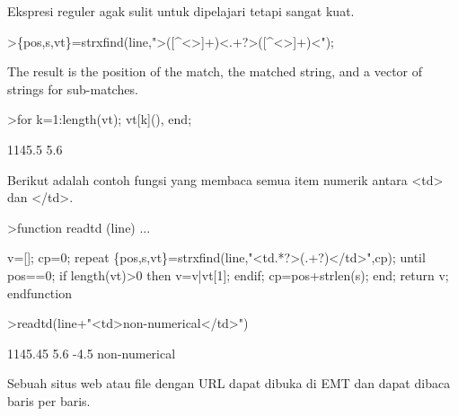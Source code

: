 \documentclass[a4paper,10pt]{article}
\begin{document}
\begin{eulernotebook}
\begin{eulercomment}
\begin{eulercomment}
\begin{eulercomment}
\begin{eulercomment}
\begin{eulercomment}
\begin{eulercomment}
\begin{eulercomment}
Ekspresi reguler agak sulit untuk dipelajari tetapi sangat kuat.
\end{eulercomment}
\begin{eulerprompt}
>\{pos,s,vt\}=strxfind(line,">([^<>]+)<.+?>([^<>]+)<");
\end{eulerprompt}
\begin{eulercomment}
The result is the position of the match, the matched string, and a
vector of strings for sub-matches.
\end{eulercomment}
\begin{eulerprompt}
>for k=1:length(vt); vt[k](), end;
\end{eulerprompt}
\begin{euleroutput}
  1145.5
  5.6
\end{euleroutput}
\begin{eulercomment}
Berikut adalah contoh fungsi yang membaca semua item numerik antara
\textless{}td\textgreater{} dan \textless{}/td\textgreater{}.
\end{eulercomment}
\begin{eulerprompt}
>function readtd (line) ...
\end{eulerprompt}
\begin{eulerudf}
  v=[]; cp=0;
  repeat
     \{pos,s,vt\}=strxfind(line,"<td.*?>(.+?)</td>",cp);
     until pos==0;
     if length(vt)>0 then v=v|vt[1]; endif;
     cp=pos+strlen(s);
  end;
  return v;
  endfunction
\end{eulerudf}
\begin{eulerprompt}
>readtd(line+"<td>non-numerical</td>")
\end{eulerprompt}
\begin{euleroutput}
  1145.45
  5.6
  -4.5
  non-numerical
\end{euleroutput}
\begin{eulercomment}
Sebuah situs web atau file dengan URL dapat dibuka di EMT dan dapat
dibaca baris per baris.


\end{eulercomment}
\end{eulercomment}
\end{eulercomment}
\end{eulercomment}
\end{eulercomment}
\end{eulercomment}
\end{eulercomment}
\end{eulernotebook}
\end{document}
